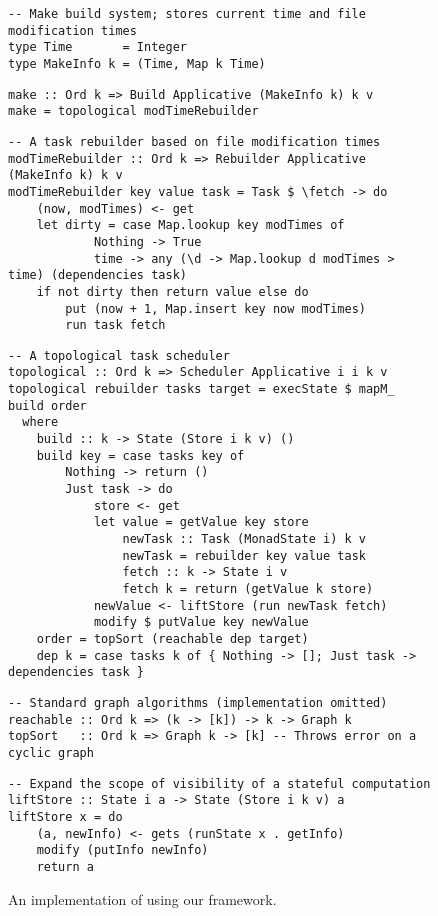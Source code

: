 \begin{figure}
\begin{verbatim}
-- Make build system; stores current time and file modification times
type Time       = Integer
type MakeInfo k = (Time, Map k Time)
\end{verbatim}
\vspace{0mm}
\begin{verbatim}
make :: Ord k => Build Applicative (MakeInfo k) k v
make = topological modTimeRebuilder
\end{verbatim}
\vspace{0mm}
\begin{verbatim}
-- A task rebuilder based on file modification times
modTimeRebuilder :: Ord k => Rebuilder Applicative (MakeInfo k) k v
modTimeRebuilder key value task = Task $ \fetch -> do
    (now, modTimes) <- get
    let dirty = case Map.lookup key modTimes of
            Nothing -> True
            time -> any (\d -> Map.lookup d modTimes > time) (dependencies task)
    if not dirty then return value else do
        put (now + 1, Map.insert key now modTimes)
        run task fetch
\end{verbatim}
\vspace{0mm}
\begin{verbatim}
-- A topological task scheduler
topological :: Ord k => Scheduler Applicative i i k v
topological rebuilder tasks target = execState $ mapM_ build order
  where
    build :: k -> State (Store i k v) ()
    build key = case tasks key of
        Nothing -> return ()
        Just task -> do
            store <- get
            let value = getValue key store
                newTask :: Task (MonadState i) k v
                newTask = rebuilder key value task
                fetch :: k -> State i v
                fetch k = return (getValue k store)
            newValue <- liftStore (run newTask fetch)
            modify $ putValue key newValue
    order = topSort (reachable dep target)
    dep k = case tasks k of { Nothing -> []; Just task -> dependencies task }
\end{verbatim}
\vspace{0mm}
\begin{verbatim}
-- Standard graph algorithms (implementation omitted)
reachable :: Ord k => (k -> [k]) -> k -> Graph k
topSort   :: Ord k => Graph k -> [k] -- Throws error on a cyclic graph
\end{verbatim}
\vspace{0mm}
\begin{verbatim}
-- Expand the scope of visibility of a stateful computation
liftStore :: State i a -> State (Store i k v) a
liftStore x = do
    (a, newInfo) <- gets (runState x . getInfo)
    modify (putInfo newInfo)
    return a
\end{verbatim}
\vspace{-3mm}
\caption{An implementation of \Make using our framework.}\label{fig-make-implementation}
\vspace{-5mm}
\end{figure}

